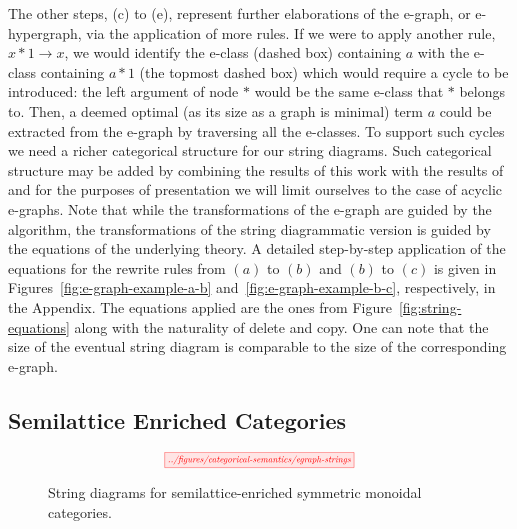 The other steps, (c) to (e), represent further elaborations of the e-graph, or e-hypergraph, via the application of more rules.
If we were to apply another rule, $x * 1 \to x$, we would identify the e-class (dashed box) containing $a$ with the e-class containing $a * 1$ (the topmost dashed box) which would require a cycle to be introduced: the left argument of node $*$ would be the same e-class that $*$ belongs to.
Then, a deemed optimal (as its size as a graph is minimal) term $a$ could be extracted from the e-graph by traversing all the e-classes.
To support such cycles we need a richer categorical structure for our string diagrams.
Such categorical structure may be added by combining the results of this work with the results of~\cite{ghica_rewriting_2023} and for the purposes of presentation we will limit ourselves to the case of acyclic e-graphs.
Note that while the transformations of the e-graph are guided by the algorithm, the transformations of the string diagrammatic version is guided by the equations of the underlying theory.
A detailed step-by-step application of the equations for the rewrite rules from $(a)$ to $(b)$ and $(b)$ to $(c)$ is given in Figures~\ref{fig:e-graph-example-a-b} and~\ref{fig:e-graph-example-b-c}, respectively, in the Appendix.
The equations applied are the ones from Figure~\ref{fig:string-equations} along with the naturality of delete and copy.
One can note that the size of the eventual string diagram is comparable to the size of the corresponding e-graph.

\subsection{Semilattice Enriched Categories}

\begin{figure}
\[
	\scalebox{0.65}{
	\tikzfig{../figures/categorical-semantics/egraph-strings}
	}
\]
\captionsetup{belowskip=-4ex}
\caption{String diagrams for semilattice-enriched symmetric monoidal categories.}
\label{fig:egraph-strings}
\end{figure}

